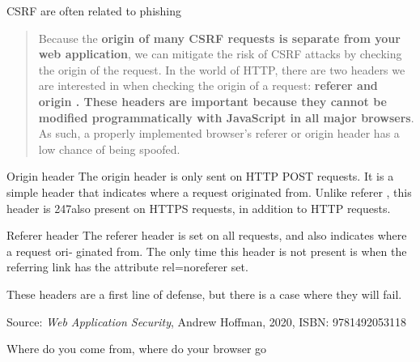 \documentclass[Screen16to9,17pt]{foils}
\begin{document}
\begin{list2}
\item CSRF are often related to phishing 
\end{list2}




\begin{quote}
Because the {\bf origin of many CSRF requests is separate from your web application}, we can mitigate the risk of CSRF attacks by checking the origin of the request. In the world of HTTP, there are two headers we are interested in when checking the origin of a request: {\bf referer and origin . These headers are important because they cannot be modified programmatically with JavaScript in all major browsers}. As such, a properly implemented browser’s referer or origin header has a low chance of being spoofed.
\end{quote}

\begin{list2}
    \item Origin header
The origin header is only sent on HTTP POST requests. It is a simple header
that indicates where a request originated from. Unlike referer , this header is
247also present on HTTPS requests, in addition to HTTP requests.

\item Referer header
The referer header is set on all requests, and also indicates where a request ori‐
ginated from. The only time this header is not present is when the referring link
has the attribute rel=noreferer set.
\end{list2}

These headers are a first line of defense, but there is a case where they will fail.


Source: \emph{Web Application Security}, Andrew Hoffman, 2020, ISBN: 9781492053118

\begin{list2}
\item Where do you come from, where do your browser go
\end{list2}


\end{document}
